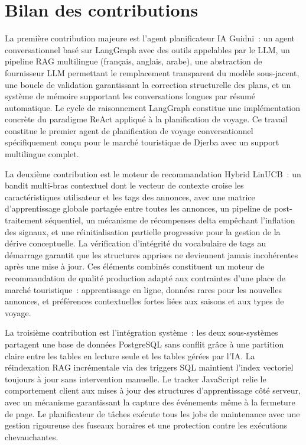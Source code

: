 
\section*{Bilan des contributions}

La première contribution majeure est l'agent planificateur IA Guidni~: 
un agent conversationnel basé sur LangGraph avec des outils appelables 
par le LLM, un pipeline RAG multilingue (français, anglais, arabe), 
une abstraction de fournisseur LLM permettant le remplacement 
transparent du modèle sous-jacent, une boucle de validation 
garantissant la correction structurelle des plans, et un système de 
mémoire supportant les conversations longues par résumé automatique. 
Le cycle de raisonnement LangGraph constitue une implémentation 
concrète du paradigme ReAct appliqué à la planification de voyage. 
Ce travail constitue le premier agent de planification de voyage 
conversationnel spécifiquement conçu pour le marché touristique de 
Djerba avec un support multilingue complet.

La deuxième contribution est le moteur de recommandation Hybrid 
LinUCB~: un bandit multi-bras contextuel dont le vecteur de contexte 
croise les caractéristiques utilisateur et les tags des annonces, 
avec une matrice d'apprentissage globale partagée entre toutes les 
annonces, un pipeline de post-traitement séquentiel, un mécanisme 
de récompenses delta empêchant l'inflation des signaux, et une 
réinitialisation partielle progressive pour la gestion de la dérive 
conceptuelle. La vérification d'intégrité du vocabulaire de tags au 
démarrage garantit que les structures apprises ne deviennent jamais 
incohérentes après une mise à jour. Ces éléments combinés constituent 
un moteur de recommandation de qualité production adapté aux 
contraintes d'une place de marché touristique~: apprentissage en 
ligne, données rares pour les nouvelles annonces, et préférences 
contextuelles fortes liées aux saisons et aux types de voyage.

La troisième contribution est l'intégration système~: les deux 
sous-systèmes partagent une base de données PostgreSQL sans conflit 
grâce à une partition claire entre les tables en lecture seule et 
les tables gérées par l'IA. La réindexation RAG incrémentale via 
des triggers SQL maintient l'index vectoriel toujours à jour sans 
intervention manuelle. Le tracker JavaScript relie le comportement 
client aux mises à jour des structures d'apprentissage côté serveur, 
avec un mécanisme garantissant la capture des événements même à la 
fermeture de page. Le planificateur de tâches exécute tous les jobs 
de maintenance avec une gestion rigoureuse des fuseaux horaires et 
une protection contre les exécutions chevauchantes.


